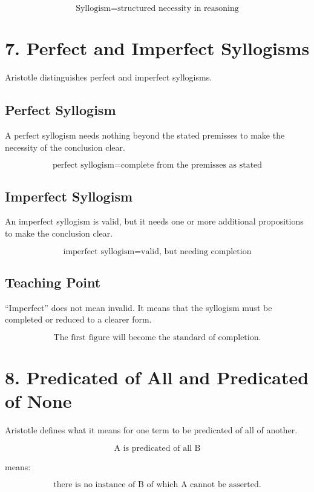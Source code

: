 \documentclass[12pt]{article}
\begin{document}
\[
\boxed{
\text{Syllogism} = \text{structured necessity in reasoning}
}
\]

\section*{7. Perfect and Imperfect Syllogisms}

Aristotle distinguishes perfect and imperfect syllogisms.

\subsection*{Perfect Syllogism}

A perfect syllogism needs nothing beyond the stated premisses to make the
necessity of the conclusion clear.

\[
\boxed{
\text{perfect syllogism} = \text{complete from the premisses as stated}
}
\]

\subsection*{Imperfect Syllogism}

An imperfect syllogism is valid, but it needs one or more additional
propositions to make the conclusion clear.

\[
\boxed{
\text{imperfect syllogism} = \text{valid, but needing completion}
}
\]

\subsection*{Teaching Point}

``Imperfect'' does not mean invalid. It means that the syllogism must be
completed or reduced to a clearer form.

\[
\boxed{
\text{The first figure will become the standard of completion.}
}
\]

\section*{8. Predicated of All and Predicated of None}

Aristotle defines what it means for one term to be predicated of all of
another.

\[
\text{A is predicated of all B}
\]

means:

\[
\text{there is no instance of B of which A cannot be asserted.}
\]
\end{document}
